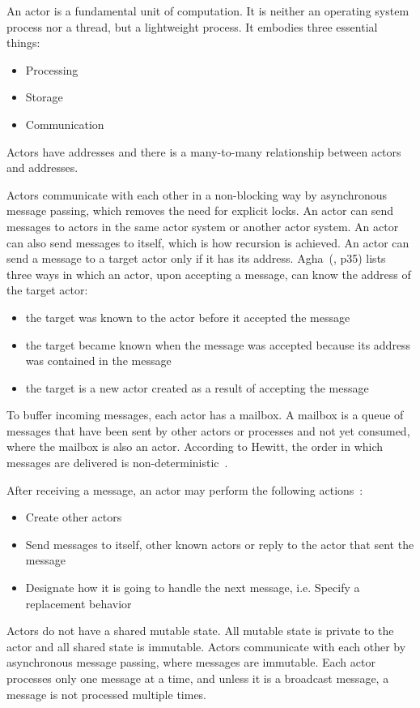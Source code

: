   An actor is a fundamental unit of computation. It is neither an operating system process nor a thread, but a lightweight process. %
  It embodies three essential things:
\begin{itemize}
  \item Processing
  \item Storage
  \item Communication
\end{itemize}
  Actors have addresses and there is a many-to-many relationship between actors and addresses.

  Actors communicate with each other in a non-blocking way by asynchronous message passing, which removes the need for explicit locks. An actor can send messages to actors in the same actor system or another actor system. An actor can also send messages to itself, which is how recursion is achieved. An actor can send a message to a target actor only if it has its address. Agha~(\cite{agha}, p35) lists three ways in which an actor, upon accepting a message, can know the address of the target actor:
  \begin{itemize}
    \item the target was known to the actor before it accepted the message
    \item the target became known when the message was accepted because its address was contained in the message
    \item the target is a new actor created as a result of accepting the message
  \end{itemize}

  To buffer incoming messages, each actor has a mailbox. A mailbox is a queue of messages that have been sent by other actors or processes and not yet consumed, where the mailbox is also an actor. According to Hewitt, the order in which messages are delivered is non-deterministic~\cite{hewittVideo}.

After receiving a message, an actor may perform the following actions~\cite{hewitt}:
\begin{itemize}
  \item Create other actors
  \item Send messages to itself, other known actors or reply to the actor that sent the message
  \item Designate how it is going to handle the next message, i.e. Specify a replacement behavior
\end{itemize}

  Actors do not have a shared mutable state. All mutable state is private to the actor and all shared state is immutable. Actors communicate with each other by asynchronous message passing, where messages are immutable. Each actor processes only one message at a time, and unless it is a broadcast message, a message is not processed multiple times.


